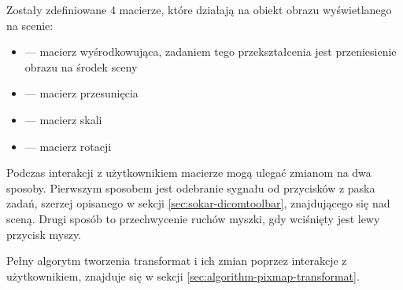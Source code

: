 Zostały zdefiniowane 4 macierze, które działają na obiekt obrazu wyświetlanego na scenie:
\begin{itemize}
    \item {} --- macierz wyśrodkowująca, zadaniem tego przekształcenia jest przeniesienie obrazu na środek sceny
    \item {} --- macierz przesunięcia
    \item {} --- macierz skali
    \item {} --- macierz rotacji
\end{itemize}

\par
Podczas interakcji z użytkownikiem macierze mogą ulegać zmianom na dwa sposoby.
Pierwszym sposobem jest odebranie sygnału od przycisków z paska zadań, szerzej opisanego w sekcji \ref{sec:sokar-dicomtoolbar}, znajdującego się nad sceną.
Drugi sposób to przechwycenie ruchów myszki, gdy wciśnięty jest lewy przycisk myszy.
\par
Pełny algorytm tworzenia transformat i ich zmian poprzez interakcje z użytkownikiem, znajduje się w sekcji \ref{sec:algorithm-pixmap-transformat}.